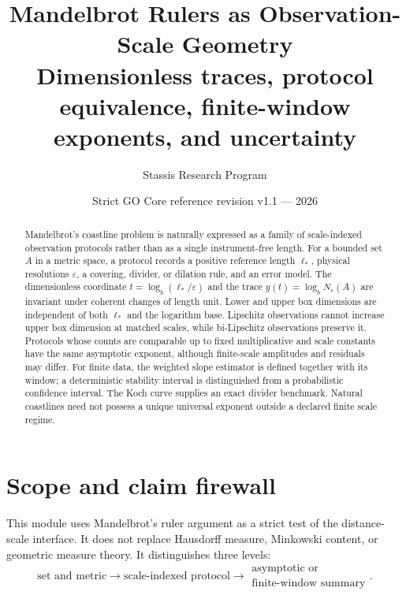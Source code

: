 \documentclass[11pt,a4paper]{article}
\title{\bfseries Mandelbrot Rulers as Observation-Scale Geometry\\
\large Dimensionless traces, protocol equivalence, finite-window exponents, and uncertainty}
\author{Stassis Research Program}
\date{Strict GO Core reference revision v1.1 --- 2026}
\theoremstyle{definition}
\theoremstyle{plain}
\theoremstyle{remark}
\begin{document}
\maketitle

\begin{center}
\end{center}

\begin{abstract}
Mandelbrot's coastline problem is naturally expressed as a family of
scale-indexed observation protocols rather than as a single
instrument-free length. For a bounded set $A$ in a metric space, a
protocol records a positive reference length $\ell_*$, physical
resolutions $\varepsilon$, a covering, divider, or dilation rule, and an
error model. The dimensionless coordinate
$t=\log_b(\ell_*/\varepsilon)$ and the trace
$y(t)=\log_bN_\varepsilon(A)$ are invariant under coherent changes of
length unit. Lower and upper box dimensions are independent of both
$\ell_*$ and the logarithm base. Lipschitz observations cannot increase
upper box dimension at matched scales, while bi-Lipschitz observations
preserve it. Protocols whose counts are comparable up to fixed
multiplicative and scale constants have the same asymptotic exponent,
although finite-scale amplitudes and residuals may differ. For finite
data, the weighted slope estimator is defined together with its window;
a deterministic stability interval is distinguished from a probabilistic
confidence interval. The Koch curve supplies an exact divider benchmark.
Natural coastlines need not possess a unique universal exponent outside a
declared finite scale regime.
\end{abstract}

\tableofcontents

\section{Scope and claim firewall}

This module uses Mandelbrot's ruler argument as a strict test of the
distance-scale interface. It does not replace Hausdorff measure,
Minkowski content, or geometric measure theory. It distinguishes three
levels:
\[
\text{set and metric}
\longrightarrow
\text{scale-indexed protocol}
\longrightarrow
\begin{gathered}
\text{asymptotic or}\\[-1mm]
\text{finite-window summary}
\end{gathered}.
\]
\end{document}
